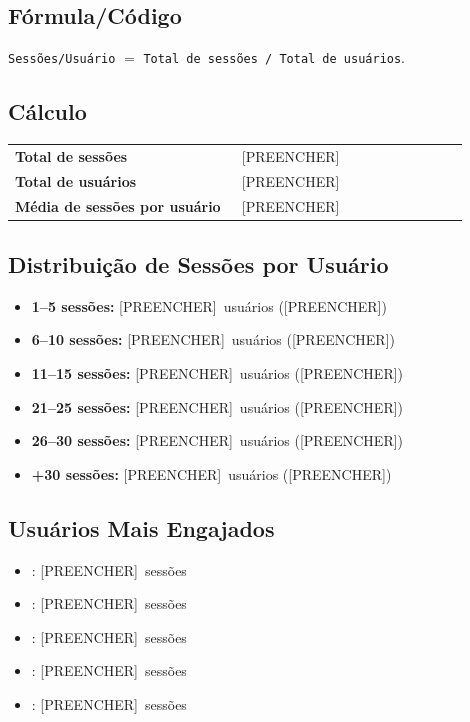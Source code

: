 \documentclass[12pt]{article}
\providecommand{\TotalSessoes}{[PREENCHER]}
\providecommand{\TotalUsuarios}{[PREENCHER]}
\providecommand{\SessoesPorUsuario}{[PREENCHER]}
\providecommand{\SessUmACinco}{[PREENCHER]}\providecommand{\SessUmACincoPct}{[PREENCHER]}
\providecommand{\SessSeisADez}{[PREENCHER]}\providecommand{\SessSeisADezPct}{[PREENCHER]}
\providecommand{\SessOnzeAQuinze}{[PREENCHER]}\providecommand{\SessOnzeAQuinzePct}{[PREENCHER]}
\providecommand{\SessVinteEUmAVinteECinco}{[PREENCHER]}\providecommand{\SessVinteEUmAVinteECincoPct}{[PREENCHER]}
\providecommand{\SessVinteESeisATrinta}{[PREENCHER]}\providecommand{\SessVinteESeisATrintaPct}{[PREENCHER]}
\providecommand{\SessMaisDeTrinta}{[PREENCHER]}\providecommand{\SessMaisDeTrintaPct}{[PREENCHER]}
\providecommand{\TopAFone}{[PREENCHER]}\providecommand{\TopASessoes}{[PREENCHER]}
\providecommand{\TopBFone}{[PREENCHER]}\providecommand{\TopBSessoes}{[PREENCHER]}
\providecommand{\TopCFone}{[PREENCHER]}\providecommand{\TopCSessoes}{[PREENCHER]}
\providecommand{\TopDFone}{[PREENCHER]}\providecommand{\TopDSessoes}{[PREENCHER]}
\providecommand{\TopEFone}{[PREENCHER]}\providecommand{\TopESessoes}{[PREENCHER]}
\begin{document}
\subsection*{Fórmula/Código}
\noindent \texttt{Sessões/Usuário} $=$ \texttt{Total de sessões / Total de usuários}.

\subsection*{Cálculo}
\begin{center}
\begin{tabular}{>{\bfseries}p{0.45\linewidth} p{0.45\linewidth}}
\toprule
Total de sessões & \TotalSessoes \\
Total de usuários & \TotalUsuarios \\
Média de sessões por usuário & \SessoesPorUsuario \\
\bottomrule
\end{tabular}
\end{center}

\subsection*{Distribuição de Sessões por Usuário}
\begin{itemize}
  \item \textbf{1--5 sessões:} \SessUmACinco\ usuários (\SessUmACincoPct)
  \item \textbf{6--10 sessões:} \SessSeisADez\ usuários (\SessSeisADezPct)
  \item \textbf{11--15 sessões:} \SessOnzeAQuinze\ usuários (\SessOnzeAQuinzePct)
  \item \textbf{21--25 sessões:} \SessVinteEUmAVinteECinco\ usuários (\SessVinteEUmAVinteECincoPct)
  \item \textbf{26--30 sessões:} \SessVinteESeisATrinta\ usuários (\SessVinteESeisATrintaPct)
  \item \textbf{+30 sessões:} \SessMaisDeTrinta\ usuários (\SessMaisDeTrintaPct)
\end{itemize}

\subsection*{Usuários Mais Engajados}
\begin{itemize}
  \item \TopAFone: \TopASessoes\ sessões
  \item \TopBFone: \TopBSessoes\ sessões
  \item \TopCFone: \TopCSessoes\ sessões
  \item \TopDFone: \TopDSessoes\ sessões
  \item \TopEFone: \TopESessoes\ sessões
\end{itemize}
\end{document}
